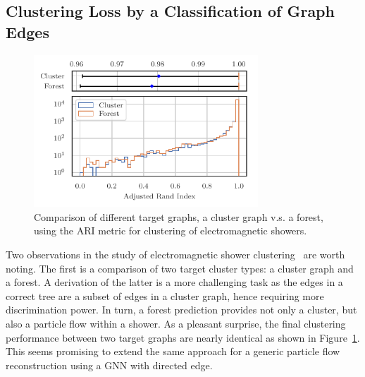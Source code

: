 \documentclass{ws-rv9x6}
\begin{document}
\subsection{Clustering Loss by a Classification of Graph Edges} 
\begin{figure}[t]
    \centering
    \includegraphics[width=0.75\textwidth]{figures/target_edge_pred_clustering_metrics.pdf}
    \caption{Comparison of different target graphs, a cluster graph v.s. a forest, using the ARI metric for clustering of electromagnetic showers.}
    \label{fig:clustering:gnn_diff_target}
\end{figure}
Two observations in the study of electromagnetic shower clustering~\cite{drielsma2020clustering} are worth noting. The first is a comparison of two target cluster types: a cluster graph and a forest. A derivation of the latter is a more challenging task as the edges in a correct tree are a subset of edges in a cluster graph, hence requiring more discrimination power. In turn, a forest prediction provides not only a cluster, but also a particle flow within a shower. As a pleasant surprise, the final clustering performance between two target graphs are nearly identical as shown in Figure~\ref{fig:clustering:gnn_diff_target}. This seems promising to extend the same approach for a generic particle flow reconstruction using a GNN with directed edge.
\end{document}
